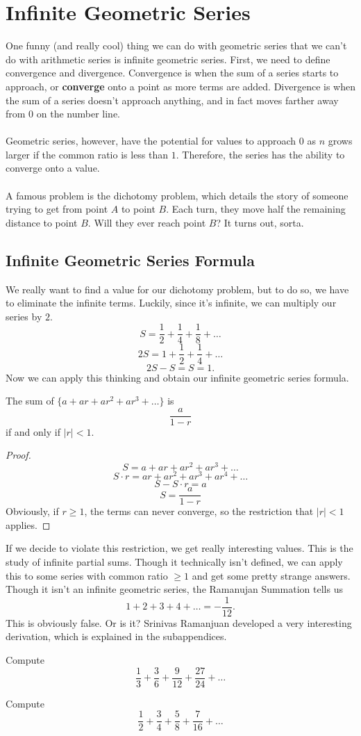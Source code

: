 \section{Infinite Geometric Series}
One funny (and really cool) thing we can do with geometric series that we can't do with arithmetic series is infinite geometric series. First, we need to define convergence and divergence. Convergence is when the sum of a series starts to approach, or \textbf{converge} onto a point as more terms are added. Divergence is when the sum of a series doesn't approach anything, and in fact moves farther away from $0$ on the number line.\\\\
Geometric series, however, have the potential for values to approach $0$ as $n$ grows larger if the common ratio is less than $1$. Therefore, the series has the ability to converge onto a value.\\\\
A famous problem is the dichotomy problem, which details the story of someone trying to get from point $A$ to point $B$. Each turn, they move half the remaining distance to point $B$. Will they ever reach point $B$? It turns out, sorta. 
\subsection{Infinite Geometric Series Formula}
We really want to find a value for our dichotomy problem, but to do so, we have to eliminate the infinite terms. Luckily, since it's infinite, we can multiply our series by $2$. 
\[S=\frac{1}{2}+\frac{1}{4}+\frac{1}{8}+\dots\]
\[2S=1+\frac{1}{2}+\frac{1}{4}+\dots\]
\[2S-S=S=1.\]
Now we can apply this thinking and obtain our infinite geometric series formula.
\begin{lemma}
    The sum of $\{a+ar+ar^2+ar^3+\dots\}$ is
    \[\frac{a}{1-r}\]
    if and only if $|r|<1$.
\end{lemma}
\begin{proof}
    \[S=a+ar+ar^2+ar^3+\dots\]
    \[S\cdot r=ar+ar^2+ar^3+ar^4+\dots\]
    \[S-S\cdot r=a\]
    \[S=\frac{a}{1-r}\]
    Obviously, if $r\geq 1$, the terms can never converge, so the restriction that $|r|<1$ applies.
\end{proof}
If we decide to violate this restriction, we get really interesting values. This is the study of infinite partial sums. Though it technically isn't defined, we can apply this to some series with common ratio $\geq 1$ and get some pretty strange answers. Though it isn't an infinite geometric series, the Ramanujan Summation tells us
\[1+2+3+4+\dots=-\frac{1}{12}.\]
This is obviously false. Or is it? Srinivas Ramanjuan developed a very interesting derivation, which is explained in the subappendices.
\begin{problem}
    Compute
    \[\frac{1}{3}+\frac{3}{6}+\frac{9}{12}+\frac{27}{24}+\dots\]
\end{problem}
\begin{problem}
    Compute
    \[\frac{1}{2}+\frac{3}{4}+\frac{5}{8}+\frac{7}{16}+\dots\]
\end{problem}
